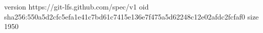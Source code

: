 version https://git-lfs.github.com/spec/v1
oid sha256:550a5d2cfc5efa1e41c7bd61c7415e136e7f475a5d62248c12e02afdc2fcfaf0
size 1950
